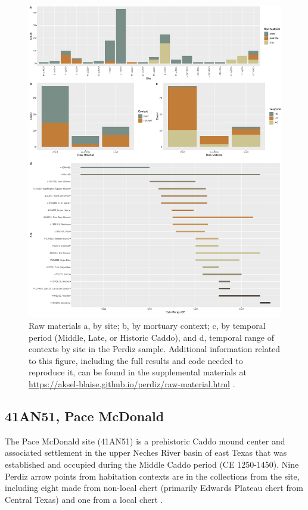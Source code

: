 \documentclass[review]{elsarticle}
\begin{document}
\begin{figure}[!]\centering
\includegraphics[width=\linewidth]{fig.mat.temp.pdf}
\caption{Raw materials a, by site; b, by mortuary context; c, by temporal period (Middle, Late, or Historic Caddo), and d, temporal range of contexts by site in the Perdiz sample. Additional information related to this figure, including the full results and code needed to reproduce it, can be found in the supplemental materials at \href{https://aksel-blaise.github.io/perdiz/raw-material.html}{https://aksel-blaise.github.io/perdiz/raw-material.html} \citep{RN8980}.}
\label{fig:raw.mat}
\end{figure}

\subsection*{41AN51, Pace McDonald}

The Pace McDonald site (41AN51) is a prehistoric Caddo mound center and associated settlement in the upper Neches River basin of east Texas that was established and occupied during the Middle Caddo period (CE 1250-1450). Nine Perdiz arrow points from habitation contexts are in the collections from the site, including eight made from non-local chert (primarily Edwards Plateau chert from Central Texas) and one from a local chert \citep{RN2444}.
\end{document}
